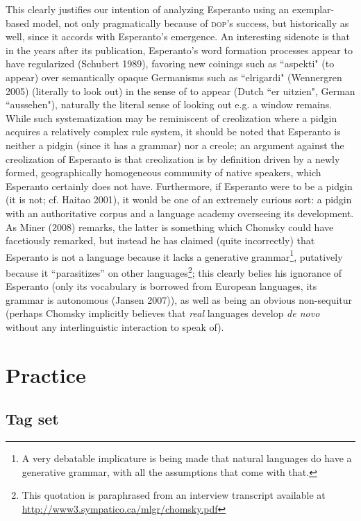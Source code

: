 \documentclass[10pt,a4paper]{article}
\begin{document}
This clearly justifies our intention of analyzing Esperanto using an
exemplar-based model, not only pragmatically because of \textsc{dop}'s success, but
historically as well, since it accords with Esperanto's emergence. An
interesting sidenote is that in the years after its publication, Esperanto's
word formation processes appear to have regularized (Schubert 1989), favoring
new coinings such as ``aspekti" (to appear) over semantically opaque Germanisms
such as ``elrigardi" (Wennergren 2005) (literally to look out) in the sense of
to appear (Dutch ``er uitzien", German ``aussehen"), naturally the literal sense
of looking out e.g. a window remains. While such systematization may be reminiscent of
creolization where a pidgin acquires a relatively complex rule system, it should be
noted that Esperanto is neither a pidgin (since it has a grammar) nor a creole; an
argument against the creolization of Esperanto is that creolization
is by definition driven by a newly formed, geographically homogeneous community
of native speakers, which Esperanto certainly does not have. Furthermore, if
Esperanto were to be a pidgin (it is not; cf.  Haitao 2001), it would be one of
an extremely curious sort: a pidgin with an authoritative corpus and a language
academy overseeing its development. As Miner (2008) remarks, the latter is
something which Chomsky could have facetiously remarked, but instead he has claimed
(quite incorrectly) that Esperanto is not a language because it lacks a generative
grammar\footnote{A very debatable implicature is being made that natural
languages do have a generative grammar, with all the assumptions that come with
that.}, putatively because it ``parasitizes'' on other
languages\footnote{This quotation is paraphrased from an interview transcript available at
\url{http://www3.sympatico.ca/mlgr/chomsky.pdf}}; this clearly belies his
ignorance of Esperanto (only its vocabulary is borrowed from European
languages, its grammar is autonomous (Jansen 2007)), as well as being an
obvious non-sequitur (perhaps Chomsky implicitly believes that {\em real}
languages develop {\em de novo} without any interlinguistic interaction to
speak of).

\pagebreak
\section{Practice}
\subsection{Tag set}
\end{document}

